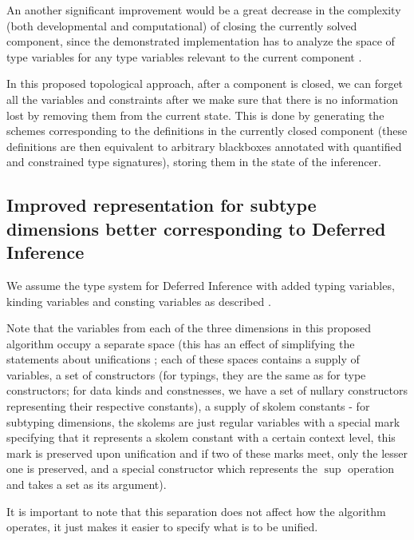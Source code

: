 An another significant improvement would be a great decrease in the complexity (both developmental and computational) of closing the currently solved component, since the demonstrated implementation has to analyze the space of type variables for any type variables relevant to the current component .

In this proposed topological approach, after a component is closed, we can forget all the variables and constraints after we make sure that there is no information lost by removing them from the current state. This is done by generating the schemes  corresponding to the definitions in the currently closed component (these definitions are then equivalent to arbitrary blackboxes annotated with quantified and constrained type signatures), storing them in the state of the inferencer.

\subsection{Improved representation for subtype dimensions better corresponding to Deferred Inference}

We assume the type system for Deferred Inference with added typing variables, kinding variables and consting variables as described .

Note that the variables from each of the three dimensions in this proposed algorithm occupy a separate space (this has an effect of simplifying the statements about unifications ; each of these spaces contains a supply of variables, a set of constructors (for typings, they are the same as for type constructors; for data kinds and constnesses, we have a set of nullary constructors representing their respective constants), a supply of skolem constants - for subtyping dimensions, the skolems are just regular variables with a special mark specifying that it represents a skolem constant with a certain context level, this mark is preserved upon unification and if two of these marks meet, only the lesser one is preserved, and a special constructor which represents the $\sup$ operation and takes a set as its argument).

\begin{remark}
    It is important to note that this separation does not affect how the algorithm operates, it just makes it easier to specify what is to be unified.
\end{remark}

